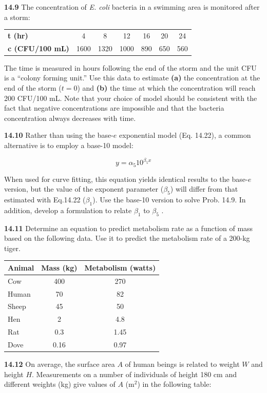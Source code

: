 \documentclass[../main.tex]{subfiles}
\begin{document}
\begin{multicols}{2}
	\noindent\textbf{14.9} The concentration of \textit{E. coli} bacteria in a swimming
	area is monitored after a storm:

	\noindent \begin{tabular}{l c c c c c c}
		\textbf{t (hr)} & 4 & 8 & 12 & 16 & 20 & 24 \\
		\textbf{c (CFU/100 mL)} & 1600 & 1320 & 1000 & 890 & 650 & 560
  	\end{tabular}

	\noindent The time is measured in hours following the end of the storm
	and the unit CFU is a ``colony forming unit.'' Use this data to
	estimate \textbf{(a)} the concentration at the end of the storm ($t = 0$)
	and \textbf{(b)} the time at which the concentration will reach
	200 CFU/100 mL. Note that your choice of model should
	be consistent with the fact that negative concentrations are
	impossible and that the bacteria concentration always decreases with time.

	\noindent\textbf{14.10} Rather than using the base-$e$ exponential model
	(Eq. 14.22), a common alternative is to employ a base-10
	model:

	$$y = \alpha_5 10^{\beta_5 x}$$

	\noindent When used for curve fitting, this equation yields identical
	results to the base-$e$ version, but the value of the exponent
	parameter ($\beta_5$) will differ from that estimated with Eq.14.22
	($\beta_1$). Use the base-10 version to solve Prob. 14.9. In addition, develop a formulation to relate $\beta_1$ to $\beta_5$ .

	\noindent\textbf{14.11} Determine an equation to predict metabolism rate as a
	function of mass based on the following data. Use it to predict the metabolism rate of a 200-kg tiger.

	\noindent \begin{tabular}{l c c }
		\textbf{Animal} & \textbf{Mass (kg)} & \textbf{Metabolism (watts)} \\
		\hline
		Cow &  400 &  270 \\
		Human &  70 &  82 \\ 
		Sheep &  45 &  50 \\ 
		Hen &  2 &  4.8 \\ 
		Rat &  0.3 &  1.45 \\ 
		Dove &  0.16 &  0.97
  	\end{tabular}

	\noindent\textbf{14.12} On average, the surface area $A$ of human beings is
	related to weight $W$ and height $H$. Measurements on a number of individuals of height 180 cm and different weights
	(kg) give values of $A$ (m$^2$) in the following table:


\end{multicols}
\end{document}
